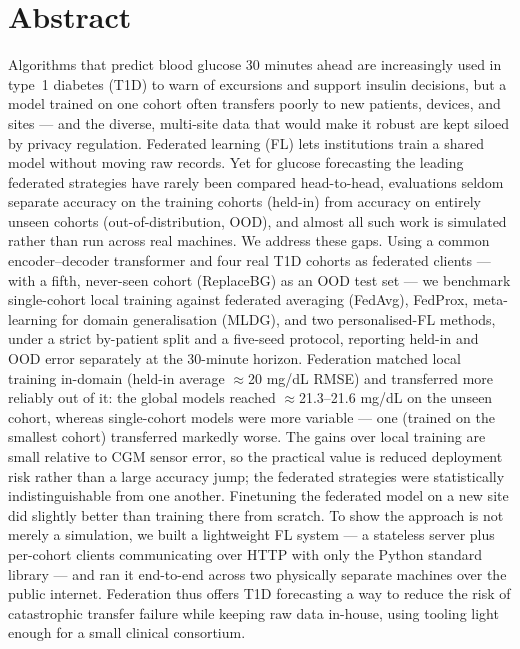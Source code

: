 \documentclass[10pt,letterpaper]{article}
\begin{document}
\section*{Abstract}
Algorithms that predict blood glucose 30 minutes ahead are increasingly used in
type~1 diabetes (T1D) to warn of excursions and support insulin decisions, but a
model trained on one cohort often transfers poorly to new patients, devices, and
sites --- and the diverse, multi-site data that would make it robust are kept
siloed by privacy regulation. Federated learning (FL) lets institutions train a
shared model without moving raw records. Yet for glucose forecasting the leading
federated strategies have rarely been compared head-to-head, evaluations seldom
separate accuracy on the training cohorts (held-in) from accuracy on entirely
unseen cohorts (out-of-distribution, OOD), and almost all such work is simulated
rather than run across real machines. We address these gaps. Using a common
encoder--decoder transformer and four real T1D cohorts as federated clients ---
with a fifth, never-seen cohort (ReplaceBG) as an OOD test set --- we benchmark
single-cohort local training against federated averaging (FedAvg), FedProx,
meta-learning for domain generalisation (MLDG), and two personalised-FL methods,
under a strict by-patient split and a five-seed protocol, reporting held-in and
OOD error separately at the 30-minute horizon. Federation matched local training
in-domain (held-in average $\approx$20 mg/dL RMSE) and transferred more reliably
out of it: the global models reached $\approx$21.3--21.6 mg/dL on the unseen
cohort, whereas single-cohort models were more variable --- one (trained on the
smallest cohort) transferred markedly worse. The gains over local training are
small relative to CGM sensor error, so the practical value is reduced
deployment risk rather than a large accuracy jump; the federated strategies were
statistically indistinguishable from one another. Finetuning the federated model
on a new site did slightly better than training there from scratch. To show the
approach is not merely a simulation, we built a lightweight FL system --- a
stateless server plus per-cohort clients communicating over HTTP with only the
Python standard library --- and ran it end-to-end across two physically separate
machines over the public internet. Federation thus offers T1D forecasting a way
to reduce the risk of catastrophic transfer failure while keeping raw data
in-house, using tooling light enough for a small clinical consortium.

\end{document}
